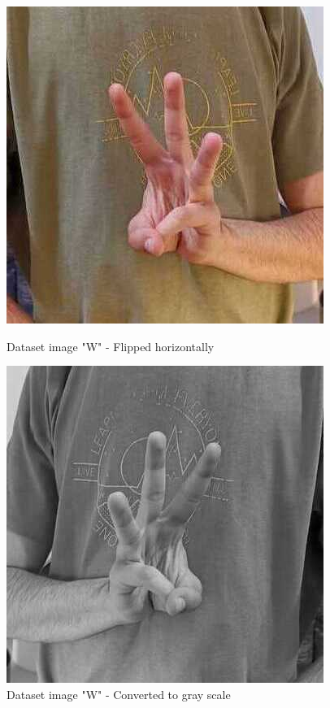 \documentclass[10pt]{article}
\begin{document}
		\begin{figure}[H]
			\centering
			\begin{minipage}[b]{0.40\textwidth}
				\includegraphics[width=\textwidth]{imgs/W-f2.jpeg}
				\caption{Dataset image "W" - Flipped horizontally}
			\end{minipage}
			\hfill
			\begin{minipage}[b]{0.40\textwidth}
				\includegraphics[width=\textwidth]{imgs/W-b2.jpeg}
				\caption{Dataset image "W" - Converted to gray scale}
			\end{minipage}
		\end{figure}
\end{document}
